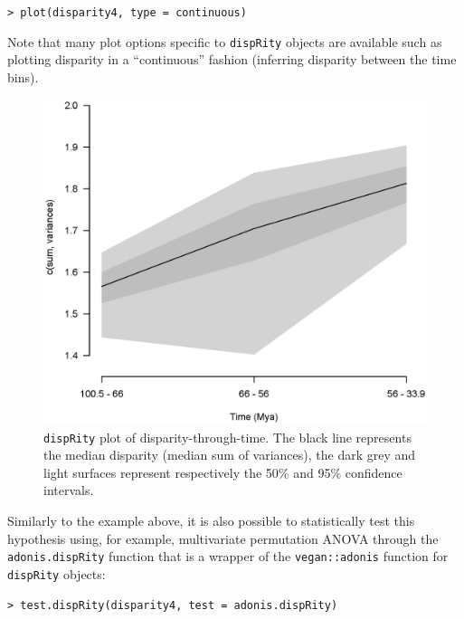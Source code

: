 \documentclass[12pt,letterpaper]{article}
\newcommand{\disp}{\texttt{dispRity} }
\begin{document}
\noindent \texttt{> plot(disparity4, type = \textquotedbl continuous\textquotedbl)}

\noindent Note that many plot options specific to \disp objects are available such as plotting disparity in a ``continuous'' fashion (inferring disparity between the time bins).

\begin{figure}[!htbp]
\centering
   \includegraphics[width=1\textwidth]{plot_example_time.eps} 
\caption{\disp plot of disparity-through-time. The black line represents the median disparity (median sum of variances), the dark grey and light surfaces represent respectively the 50\% and 95\% confidence intervals.}
\label{Fig:plot_time}
\end{figure}

Similarly to the example above, it is also possible to statistically test this hypothesis using, for example, multivariate permutation ANOVA  \citep[PERMANOVA; ][]{NPMANOVA} through the \texttt{adonis.dispRity} function that is a wrapper of the \texttt{vegan::adonis} function  \citep{oksanen2007vegan} for \texttt{dispRity} objects:

\noindent \texttt{> test.dispRity(disparity4, test = adonis.dispRity)}
\end{document}
